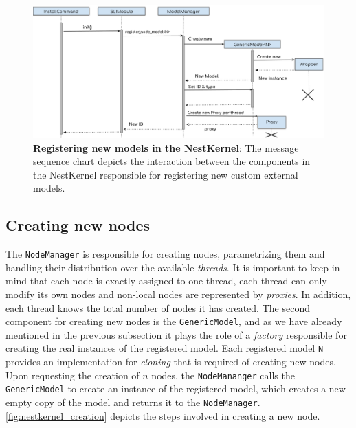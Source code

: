 \vspace{0.5cm}
\begin{figure}[ht!]
\centering
\includegraphics[width=\textwidth]{src/pic/register.png}
\caption{\textbf{Registering new models in the NestKernel}: The message sequence chart depicts the interaction between the components in the NestKernel responsible for registering new custom external models.}
\label{fig:nestkernel_register}
\end{figure}

\subsection{Creating new nodes}

The \texttt{NodeManager} is responsible for creating nodes, parametrizing them and handling their distribution over the available \emph{threads}. It is important to keep in mind that each node is exactly assigned to one thread, each thread can only modify its own nodes and non-local nodes are represented by \emph{proxies}. In addition, each thread knows the total number of nodes it has created. The second component for creating new nodes is the \texttt{GenericModel}, and as we have already mentioned in the previous subsection it plays the role of a \emph{factory} responsible for creating the real instances of the registered model. Each registered model \texttt{N} provides an implementation for \emph{cloning} that is required of creating new nodes. Upon requesting the creation of $n$ nodes, the \texttt{NodeMananger} calls the \texttt{GenericModel} to create an instance of the registered model, which creates a new empty copy of the model and returns it to the \texttt{NodeManager}. \autoref{fig:nestkernel_creation} depicts the steps involved in creating a new node.

